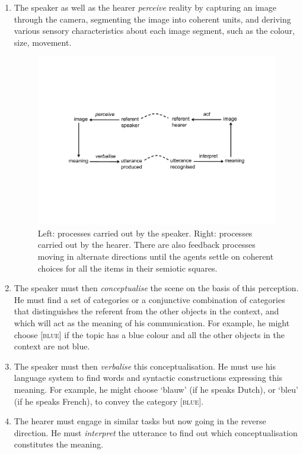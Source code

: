 \begin{enumerate}
\item The speaker as well as the hearer {\itshape perceive} reality
by capturing an image through the camera, segmenting 
the image into coherent units, and deriving various 
sensory characteristics about each image segment, 
such as the colour, size, movement. 

\begin{figure}[htbp]
  \centerline{\includegraphics[width=.75\textwidth]{chap2/figs/triangle2.pdf}}
\caption{\label{triangle2a}Left: processes carried
out by the speaker. Right: processes carried out by the hearer.
There are also feedback processes moving in alternate directions
until the agents settle on coherent choices for all the items
in their semiotic squares.}
\end{figure}

\item The speaker must then {\itshape conceptualise} the 
scene on the basis of this perception. He must find a set of
categories or a conjunctive combination of 
categories that distinguishes the referent from the other objects in 
the context, and which will act as the meaning of 
his communication. For example, he might choose [\textsc{blue}] if the
topic has a blue colour and all the other objects in the 
context are not blue. 

\item The speaker must then {\itshape verbalise} this conceptualisation. 
He must use his language system to find words and 
syntactic constructions expressing this meaning.
For example, he might choose `blauw' (if he speaks
Dutch), or `bleu' (if he speaks French),
to convey the category [\textsc{blue}]. 

\item The hearer must engage in similar tasks but now
going in the reverse direction. He must
{\itshape interpret} the utterance to find out which
conceptualisation constitutes the meaning. 


\end{enumerate}
